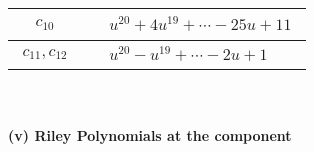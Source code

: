 \documentclass[1p]{elsarticle_modified}
\theoremstyle{definition}
\begin{document}
\begin{tabular}{m{50pt}|m{274pt}}
\hline $$\begin{aligned}c_{10}\end{aligned}$$&$\begin{aligned}
&u^{20}+4 u^{19}+\cdots-25 u+11
\end{aligned}$\\
\hline $$\begin{aligned}c_{11},c_{12}\end{aligned}$$&$\begin{aligned}
&u^{20}- u^{19}+\cdots-2 u+1
\end{aligned}$\\
\hline
\end{tabular}\\~\\
\newpage\renewcommand{\arraystretch}{1}
\flushleft \textbf{(v) Riley Polynomials at the component}\newline \\
\end{document}
